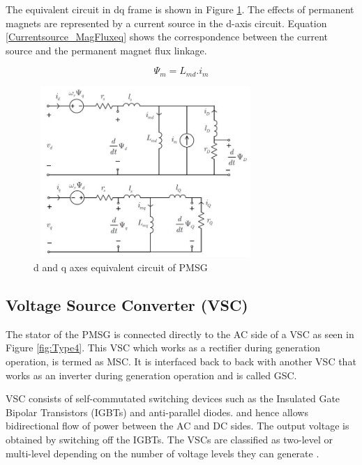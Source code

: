 The equivalent circuit in \gls{dq} frame is shown in Figure \ref{fig:PMSG_equiv_ckt}. The effects of permanent magnets are represented by a current source in the d-axis circuit. Equation \ref{Currentsource_MagFluxeq} shows the correspondence between the current source and the permanent magnet flux linkage.

\begin{equation}\label{Currentsource_MagFluxeq}
    \Psi_m = L_{md} . i_m
\end{equation}

\begin{figure}[H]
\centering
    \includegraphics[height = 6.5cm,width = 8.5cm]{Diagrams/Chapter_2/PMSG_equiv_ckt.png}
    \caption{d and q axes equivalent circuit of PMSG \cite{sebastian_transient_1989}}
    \label{fig:PMSG_equiv_ckt}
\end{figure}

\subsection{Voltage Source Converter (VSC)}\label{VSC_theory}
The stator of the \gls{PMSG} is connected directly to the \gls{AC} side of a \gls{VSC} as seen in Figure \ref{fig:Type4}. This \gls{VSC} which works as a rectifier during generation operation, is termed as \gls{MSC}. It is interfaced back to back with another \gls{VSC} that works as an inverter during generation operation and is called \gls{GSC}.

\gls{VSC} consists of self-commutated switching devices such as the Insulated Gate Bipolar Transistors (\gls{IGBT}s) and anti-parallel diodes. and hence allows bidirectional flow of power between the \gls{AC} and \gls{DC} sides. The output voltage is obtained by switching off the \gls{IGBT}s. The \gls{VSC}s are classified as two-level or multi-level depending on the number of voltage levels they can generate \cite{noauthor_appendix_2014-1}. 

